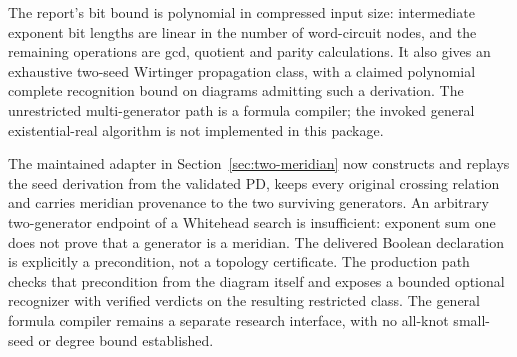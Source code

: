The report's bit bound is polynomial in compressed input size: intermediate
exponent bit lengths are linear in the number of word-circuit nodes, and the
remaining operations are gcd, quotient and parity calculations. It also gives
an exhaustive two-seed Wirtinger propagation class, with a claimed polynomial
complete recognition bound on diagrams admitting such a derivation. The
unrestricted multi-generator path is a formula compiler; the invoked general
existential-real algorithm is not implemented in this package.

The maintained adapter in Section~\ref{sec:two-meridian} now constructs and
replays the seed derivation from the validated PD, keeps every original crossing
relation and carries meridian provenance to the two surviving generators.
An arbitrary two-generator endpoint of a Whitehead search is insufficient:
exponent sum one does not prove that a generator is a meridian. The delivered
Boolean declaration is explicitly a precondition, not a topology certificate.
The production path checks that precondition from the diagram itself and
exposes a bounded optional recognizer with verified verdicts on the resulting
restricted class. The general formula compiler remains a separate research
interface, with no all-knot small-seed or degree bound established.
